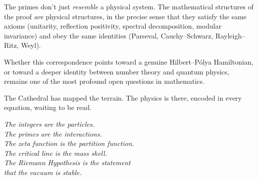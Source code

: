 \documentclass[11pt,a4paper]{article}
\theoremstyle{definition}
\begin{document}
The primes don't just \emph{resemble} a physical system. The
mathematical structures of the proof \emph{are} physical structures,
in the precise sense that they satisfy the same axioms (unitarity,
reflection positivity, spectral decomposition, modular invariance)
and obey the same identities (Parseval, Cauchy--Schwarz, Rayleigh--Ritz,
Weyl).

Whether this correspondence points toward a genuine Hilbert--P\'olya
Hamiltonian, or toward a deeper identity between number theory and
quantum physics, remains one of the most profound open questions in
mathematics.

The Cathedral has mapped the terrain. The physics is there,
encoded in every equation, waiting to be read.

\begin{flushright}
\emph{The integers are the particles.\\
The primes are the interactions.\\
The zeta function is the partition function.\\
The critical line is the mass shell.\\
The Riemann Hypothesis is the statement\\
that the vacuum is stable.}
\end{flushright}
\end{document}
